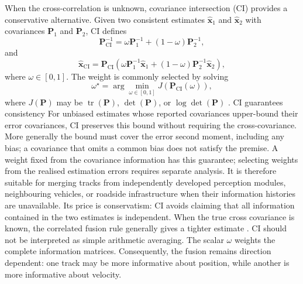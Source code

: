 \documentclass[graybox,envcountchap]{style/SNmono}
\providecommand{\DIFadd}[1]{{\protect\color{blue} #1}} %
\providecommand{\DIFdel}[1]{{\protect\color{red} #1}} %
\providecommand{\DIFaddbegin}{} %
\providecommand{\DIFaddend}{} %
\providecommand{\DIFdelbegin}{} %
\providecommand{\DIFdelend}{} %
\begin{document}
When the cross-correlation is unknown, covariance intersection (CI)
provides a conservative alternative. Given two consistent estimates
$\widehat{\mathbf{x}}_{1}$ and $\widehat{\mathbf{x}}_{2}$ with covariances
$\mathbf{P}_{1}$ and $\mathbf{P}_{2}$, CI defines
\begin{equation}
\mathbf{P}_{\mathrm{CI}}^{-1}=\omega\mathbf{P}_{1}^{-1}+(1-\omega)\mathbf{P}_{2}^{-1},
\label{eq:ci-cov}
\end{equation}
and
\begin{equation}
\widehat{\mathbf{x}}_{\mathrm{CI}}=\mathbf{P}_{\mathrm{CI}}\left(\omega\mathbf{P}_{1}^{-1}\widehat{\mathbf{x}}_{1}+(1-\omega)\mathbf{P}_{2}^{-1}\widehat{\mathbf{x}}_{2}\right),
\label{eq:ci-est}
\end{equation}
where $\omega\in[0,1]$. The weight is commonly selected by solving
\begin{equation}
\omega^{\star}=\arg\min_{\omega\in[0,1]}J\!\left(\mathbf{P}_{\mathrm{CI}}(\omega)\right),
\label{eq:ci-weight}
\end{equation}
where $J(\mathbf{P})$ may be
$\operatorname{tr}(\mathbf{P})$,
$\det(\mathbf{P})$, or
$\log\det(\mathbf{P})$
\cite{uhlmann1995dynamic,julier1997nondivergent,julier2001general}. \DIFdelbegin \DIFdel{CI guarantees consistency }\DIFdelend \DIFaddbegin \DIFadd{For unbiased estimates whose reported covariances upper-bound their error covariances, CI preserves this bound }\DIFaddend without requiring the cross-covariance. \DIFaddbegin \DIFadd{More generally the bound must cover the error second moment, including any bias; a covariance that omits a common bias does not satisfy the premise. A weight fixed from the covariance information has this guarantee; selecting weights from the realised estimation errors requires separate analysis. }\DIFaddend It is therefore suitable for merging tracks from independently developed
perception modules, neighbouring vehicles, or roadside infrastructure when their information histories are unavailable. Its price is conservatism: CI avoids claiming that all information contained in the two estimates is independent. When the true cross covariance is known, the correlated fusion rule generally gives a tighter estimate \cite{barshalom2011tracking,julier2001general}. CI should not be interpreted as simple arithmetic averaging. The scalar
$\omega$ weights the complete information matrices. Consequently, the
fusion remains direction dependent: one track may be more informative
about position, while another is more informative about velocity.
\end{document}
